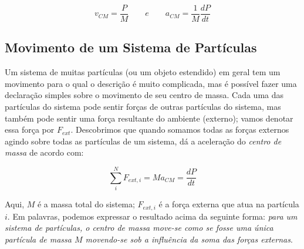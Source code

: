 $$
v_{CM}=\frac{P}{M} \qquad e \qquad a_{CM}=\frac{1}{M}\frac{dP}{dt}
$$

\subsection{Movimento de um Sistema de Partículas}
Um sistema de muitas partículas (ou um objeto estendido) em geral tem um movimento para o qual o descrição é muito complicada, mas é possível fazer uma declaração simples sobre o
movimento de seu centro de massa. Cada uma das partículas do sistema pode sentir forças de outras partículas do sistema, mas também pode sentir uma força resultante do ambiente (externo); vamos denotar essa força por $F_{ext}$. Descobrimos que quando somamos todas as forças externos agindo sobre todas as partículas de um sistema, dá a aceleração do \emph{centro de massa} de acordo com:

\begin{equation}
    \sum_{i}^{N}F_{ext, i}=Ma_{CM}=\frac{dP}{dt}
\end{equation}

Aqui, $M$ é a massa total do sistema; $F_{ext, i}$ é a força externa que atua na partícula $i$.
Em palavras, podemos expressar o resultado acima da seguinte forma: \emph{para um sistema de partículas, o centro de massa move-se como se fosse uma única partícula de massa $M$ movendo-se sob a influência da soma das forças externas}.
